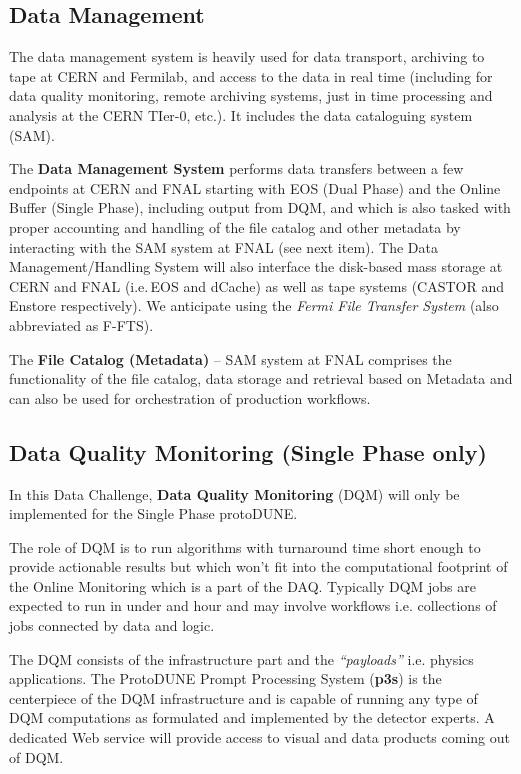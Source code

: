 \documentclass[pdftex,12pt,letter]{article}
\newcommand{\pd}{protoDUNE\xspace}
\newcommand{\singp}{Single Phase\xspace}
\newcommand{\dualp}{Dual Phase\xspace}
\begin{document}
\subsection{Data Management}
The data management system is heavily used for data transport, archiving to tape at CERN and Fermilab, and access to the data in real time (including for data quality monitoring, remote archiving systems,  just in time processing and analysis at the CERN TIer-0, etc.). It includes the data cataloguing system (SAM).

The \textbf{Data Management System}\cite{docdb1212}  performs data transfers between a few endpoints
at CERN and FNAL starting with EOS (\dualp) and the Online Buffer (\singp), including output from DQM,  and which is also tasked with proper accounting and handling of the file catalog and other metadata
by interacting with the SAM system at FNAL (see next item). The Data Management/Handling System will also interface the disk-based mass storage
at CERN and FNAL (i.e.\,EOS\cite{eos} and dCache) as well as tape systems (CASTOR and Enstore respectively).
We anticipate using the \textit{Fermi File Transfer System} (also abbreviated as F-FTS\cite{fts}).

The \textbf{File Catalog (Metadata)}  -- SAM system at FNAL comprises the functionality of the file catalog, data storage and
retrieval based on Metadata and can also be used for orchestration of production workflows.

\subsection{Data Quality Monitoring (Single Phase only)}

In this Data Challenge, \textbf{Data Quality Monitoring} (DQM) will only be implemented for the Single Phase \pd.

The role of DQM is to run algorithms with turnaround time short enough to provide
actionable results  but which won't fit into the computational footprint of the Online Monitoring which is a part of the DAQ.
Typically DQM jobs are expected to run in under and hour and may involve workflows i.e. collections of jobs connected
by data and logic.

The DQM consists of the infrastructure part and the \textit{``payloads''} i.e. physics applications. 
The ProtoDUNE Prompt Processing System (\textbf{p3s}) \cite{docdb1811,p3s}  is the centerpiece
of the DQM infrastructure and is capable of running any type of DQM computations
as formulated and implemented by the detector experts. A dedicated Web
service will provide access to visual and data products coming out of DQM.
\end{document}
